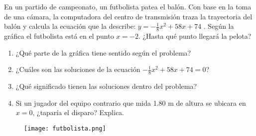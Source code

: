 \begin{boxF}
    En un partido de campeonato, un futbolista patea el balón. Con
    base en la toma de una cámara, la computadora del centro de
    transmisión traza la trayectoria del balón y calcula la ecuación
    que la describe: $y = - \frac{1}{8}x^2 + 58 x + 74$ . Según la gráfica el futbolista
    está en el punto $x = -2$. ¿Hasta qué punto llegará la pelota?
    \begin{enumerate}
        \item ¿Qué parte de la gráfica tiene sentido según el problema?
        \item ¿Cuáles son las soluciones de la ecuación $-\frac{1}{8}x^2 + 58 x + 74 = 0$?
        \item ¿Qué significado tienen las soluciones dentro del problema?
        \item Si un jugador del equipo contrario que mida 1.80 m de altura
              se ubicara en $x = 0$, ¿taparía el disparo? Explica.
    \end{enumerate}

    \begin{figure}[H]
        \centering
        \texttt{[image: futbolista.png]}
        \label{fig:futbolista}
    \end{figure}
\end{boxF}

\newpage
